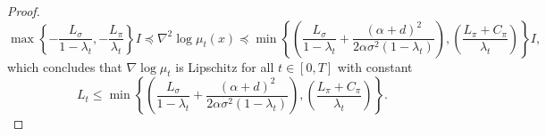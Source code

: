 \begin{proof}
\begin{equation}
    \max\left\{-\frac{L_\sigma}{1-\lambda_t}, -\frac{L_\pi}{\lambda_t}\right\}I \preccurlyeq \nabla^2\log\mu_t(x) \preccurlyeq \min\left\{ \left(\frac{L_\sigma}{1-\lambda_t}+ \frac{(\alpha + d)^2}{2\alpha\sigma^2(1-\lambda_t)}\right) ,\left(\frac{L_\pi + C_\pi}{\lambda_t}\right) \right\}I, \label{eq:lipschitz_constant_t_heavy_tailed_diffusion}
\end{equation}
which concludes that $\nabla\log\mu_t$ is Lipschitz for all $t\in[0, T]$ with constant
\begin{equation*}
    L_t\leq \min\left\{ \left(\frac{L_\sigma}{1-\lambda_t}+ \frac{(\alpha + d)^2}{2\alpha\sigma^2(1-\lambda_t)}\right) ,\left(\frac{L_\pi + C_\pi}{\lambda_t}\right) \right\}.
\end{equation*}


\end{proof}

